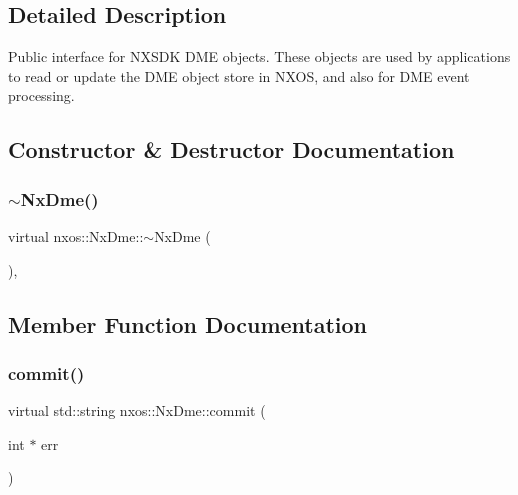 \subsection{Detailed Description}
Public interface for N\+X\+S\+DK D\+ME objects. These objects are used by applications to read or update the D\+ME object store in N\+X\+OS, and also for D\+ME event processing. 

\subsection{Constructor \& Destructor Documentation}
\mbox{\label{classnxos_1_1_nx_dme_a8dc547fb29c4db31558f05566cde616d}} 
\subsubsection{\texorpdfstring{$\sim$\+Nx\+Dme()}{~NxDme()}}
{\footnotesize\ttfamily virtual nxos\+::\+Nx\+Dme\+::$\sim$\+Nx\+Dme (\begin{DoxyParamCaption}{ }\end{DoxyParamCaption})\hspace{0.3cm}{\ttfamily [inline]}, {\ttfamily [virtual]}}



\subsection{Member Function Documentation}
\mbox{\label{classnxos_1_1_nx_dme_a61e01267ff642ace49a8fe75296a0cbd}} 
\subsubsection{\texorpdfstring{commit()}{commit()}}
{\footnotesize\ttfamily virtual std\+::string nxos\+::\+Nx\+Dme\+::commit (\begin{DoxyParamCaption}\item[{int $\ast$}]{err }\end{DoxyParamCaption})\hspace{0.3cm}{\ttfamily [pure virtual]}}

